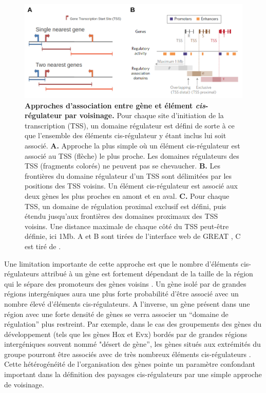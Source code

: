 \begin{figure}[h]
    \centering
    \includegraphics[width=1\textwidth, page=1] {figures/chap2/chap2-fig1.png}
    \caption[Approches d'association entre gène et élément \textit{cis}-régulateur par voisinage.]{
    \textbf{Approches d'association entre gène et élément \textit{cis}-régulateur par voisinage.}
    Pour chaque site d'initiation de la transcription (\acrshort{TSS}), un domaine régulateur est défini de sorte à ce que l'ensemble des éléments \gls{cis}-régulateur y étant inclus lui soit associé.
    \textbf{A.} Approche la plus simple où un élément \gls{cis}-régulateur est associé au \acrshort{TSS} (flèche) le plus proche. Les domaines régulateurs des \acrshort{TSS} (fragments colorés) ne peuvent pas se chevaucher.
    \textbf{B.} Les frontières du domaine régulateur d'un \acrshort{TSS} sont délimitées par les positions des \acrshort{TSS} voisins. Un élément \gls{cis}-régulateur est associé aux deux gènes les plus proches en amont et en aval.
    \textbf{C.} Pour chaque \acrshort{TSS}, un domaine de régulation proximal exclusif est défini, puis étendu jusqu'aux frontières des domaines proximaux des \acrshort{TSS} voisins. Une distance maximale de chaque côté du \acrshort{TSS} peut-être définie, ici 1Mb. A et B sont tirées de l'interface web de GREAT \citep{mclean_great_2010}, C est tiré de \citep{berthelot_complexity_2018}.  \\
    }
    \label{fig:chap2-fig1}
\end{figure} 

Une limitation importante de cette approche est que le nombre d’éléments \gls{cis}-régulateurs attribué à un gène est fortement dépendant de la taille de la région qui le sépare des promoteurs des gènes voisins \citep{taher_variable_2009}. Un gène isolé par de grandes régions intergéniques aura une plus forte probabilité d’être associé avec un nombre élevé d’éléments \gls{cis}-régulateurs. A l’inverse, un gène présent dans une région avec une forte densité de gènes se verra associer un “domaine de régulation” plus restreint. Par exemple, dans le cas des groupements des gènes du développement (tels que les gènes Hox et Evx) bordés par de grandes régions intergéniques souvent nommé "désert de gène”, les gènes situés aux extrémités du groupe pourront être associés avec de très nombreux éléments \gls{cis}-régulateurs \citep{taher_variable_2009}. Cette hétérogénéité de l’organisation des gènes pointe un paramètre confondant important dans la définition des paysages \gls{cis}-régulateurs par une simple approche de voisinage.

